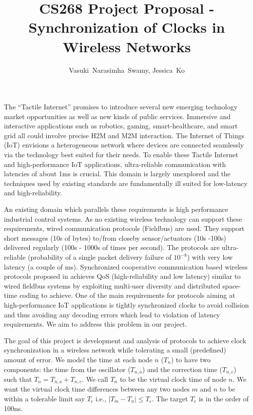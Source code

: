 \documentclass[11pt, draftclsnofoot, onecolumn]{IEEEtran}
\begin{document}
\title{CS268 Project Proposal - Synchronization of Clocks in Wireless Networks}

\author{Vasuki~Narasimha~Swamy,
	Jessica~Ko\\
	\vspace{-45pt}}
\maketitle
{}

The ``Tactile Internet'' promises to introduce several new emerging technology market opportunities as well as new kinds of public services. Immersive and interactive applications such as robotics, gaming, smart-healthcare, and smart grid all could involve precise H2M and M2M interaction.
The Internet of Things (IoT) envisions a heterogeneous network where devices are connected seamlessly via the technology best suited for their needs.
To enable these Tactile Internet and high-performance IoT applications, ultra-reliable communication with latencies of about 1ms is crucial.
This domain is largely unexplored and the techniques used by existing standards are fundamentally ill suited for low-latency and high-reliability. %

An existing domain which parallels these requirements is high performance industrial control systems.
As no existing wireless technology can support these requirements, wired communication protocols (Fieldbus) are used.
They support short messages (10s of bytes) to/from closeby sensor/actuators (10s -100s) delivered regularly (100s - 1000s of times per second). The protocols are ultra-reliable (probability of a single packet delivery failure of $10^{-8}$) with very low latency (a couple of ms).
Synchronized cooperative communication based wireless protocols proposed in \cite{swamy2015cooperative, swamy2016cooperative} achieves QoS (high-reliability and low latency) similar to wired fieldbus systems by exploiting multi-user diversity and distributed space-time coding to achieve.
One of the main requirements for protocols aiming at high-performance IoT applications is tightly synchronized clocks to avoid collision and thus avoiding any decoding errors which lead to violation of latency requirements. We aim to address this problem in our project.

The goal of this project is development and analysis of protocols to achieve clock synchronization in a wireless network while tolerating a small (predefined) amount of error.
We model the time at each node $n$ ($T_n$) to have two components: the time from the oscillator ($T_{n,o}$) and the correction time ($T_{n,c}$) such that $T_n = T_{n,o} + T_{n,c}$. We call $T_n$ to be the virtual clock time of node $n$. We want the virtual clock time differences between any two nodes $m$ and $n$ to be within a tolerable limit say $T_{\epsilon}$ i.e., $|T_m - T_n| \leq T_{\epsilon}$. The target $T_{\epsilon}$ is in the order of 100ns.
\end{document}
